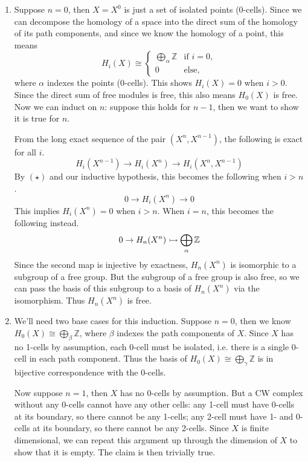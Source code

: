 \documentclass[twoside,10pt]{article}
\begin{document}
\begin{enumerate}
	\item Suppose $n=0$, then $X=X^{0}$ is just a set of isolated points (0-cells). Since we can decompose the homology of a space into the direct sum of the homology of its path components, and since we know the homology of a point, this means
		\[
			H_{i}(X) \cong 
			\begin{cases}
				\bigoplus_{\alpha}\mathbb{Z} & \text{if } i=0,\\
				0 & \text{else},
			\end{cases}
		\] where $\alpha$ indexes the points (0-cells). This shows $H_{i}(X) = 0$ when $i>0$. Since the direct sum of free modules is free, this also means $H_{0}(X)$ is free. Now we can induct on $n$: suppose this holds for $n-1$, then we want to show it is true for $n$.

		From the long exact sequence of the pair $(X^{n},X^{n-1})$, the following is exact for all $i$.
		\[
			H_{i}(X^{n-1}) \to H_{i}(X^{n}) \to H_{i}(X^{n},X^{n-1})
		\] By $(\star)$ and our inductive hypothesis, this becomes the following when $i > n$.
		\[
			0 \to H_{i}(X^{n}) \to 0
		\] This implies $H_{i}(X^{n}) = 0$ when $i>n$. When $i=n$, this becomes the following instead.
		\[
			0 \to H_{n}(X^{n}) \rightarrowtail \bigoplus_{\alpha}\mathbb{Z}
		\] Since the second map is injective by exactness, $H_{n}(X^{n})$ is isomorphic to a subgroup of a free group. But the subgroup of a free group is also free, so we can pass the basis of this subgroup to a basis of $H_{n}(X^{n})$ via the isomorphism. Thus $H_{n}(X^{n})$ is free.

	\item We'll need two base cases for this induction. Suppose $n=0$, then we know $H_{0}(X) \cong \bigoplus_{\beta} \mathbb{Z}$, where $\beta$ indexes the path components of $X$. Since $X$ has no 1-cells by assumption, each 0-cell must be isolated, i.e. there is a single 0-cell in each path component. Thus the basis of $H_0(X) \cong \bigoplus_{\gamma}\mathbb{Z}$ is in bijective correspondence with the 0-cells.

		Now suppose $n=1$, then $X$ has no 0-cells by assumption. But a CW complex without any 0-cells cannot have any other cells: any 1-cell must have 0-cells at its boundary, so there cannot be any 1-cells; any 2-cell must have 1- and 0-cells at its boundary, so there cannot be any 2-cells. Since $X$ is finite dimensional, we can repeat this argument up through the dimension of $X$ to show that it is empty. The claim is then trivially true.


\end{enumerate}
\end{document}
